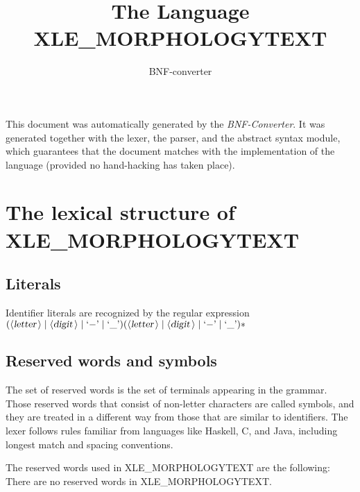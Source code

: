 \documentclass[a4paper,11pt]{article}
\author{BNF-converter}
\title{The Language XLE_MORPHOLOGYTEXT}
\begin{document}
\maketitle

\newcommand{\emptyP}{\mbox{$\epsilon$}}
\newcommand{\terminal}[1]{\mbox{{\texttt {#1}}}}
\newcommand{\nonterminal}[1]{\mbox{$\langle \mbox{{\sl #1 }} \! \rangle$}}
\newcommand{\arrow}{\mbox{::=}}
\newcommand{\delimit}{\mbox{$|$}}
\newcommand{\reserved}[1]{\mbox{{\texttt {#1}}}}
\newcommand{\literal}[1]{\mbox{{\texttt {#1}}}}
\newcommand{\symb}[1]{\mbox{{\texttt {#1}}}}

This document was automatically generated by the {\em BNF-Converter}. It was generated together with the lexer, the parser, and the abstract syntax module, which guarantees that the document matches with the implementation of the language (provided no hand-hacking has taken place).

\section*{The lexical structure of XLE_MORPHOLOGYTEXT}

\subsection*{Literals}


Identifier literals are recognized by the regular expression
\(({\nonterminal{letter}} \mid {\nonterminal{digit}} \mid \mbox{`{$-$}'} \mid \mbox{`\_'}) ({\nonterminal{letter}} \mid {\nonterminal{digit}} \mid \mbox{`{$-$}'} \mid \mbox{`\_'})*\)


\subsection*{Reserved words and symbols}
The set of reserved words is the set of terminals appearing in the grammar. Those reserved words that consist of non-letter characters are called symbols, and they are treated in a different way from those that are similar to identifiers. The lexer follows rules familiar from languages like Haskell, C, and Java, including longest match and spacing conventions.

The reserved words used in XLE_MORPHOLOGYTEXT are the following: \\

There are no reserved words in XLE_MORPHOLOGYTEXT.\\
\end{document}
